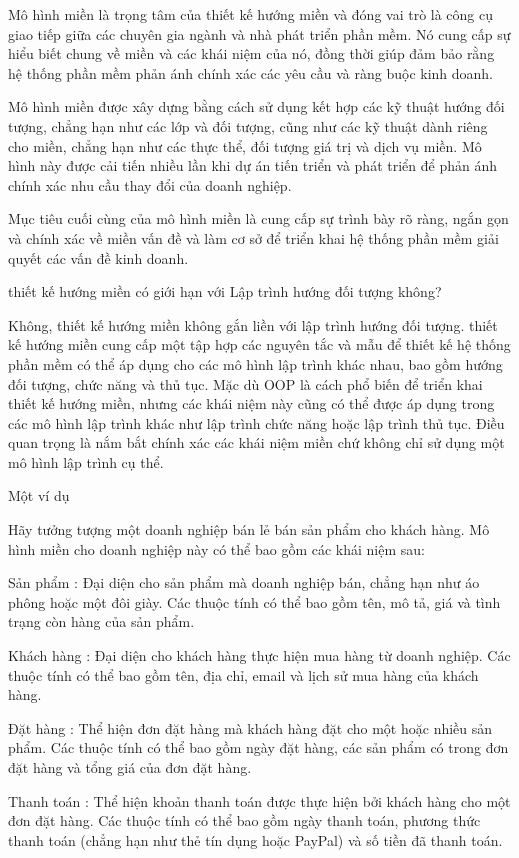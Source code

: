 Mô hình miền là trọng tâm của thiết kế hướng miền và đóng vai trò là công cụ giao tiếp giữa các chuyên gia ngành và nhà phát triển phần mềm. Nó cung cấp sự hiểu biết chung về miền và các khái niệm của nó, đồng thời giúp đảm bảo rằng hệ thống phần mềm phản ánh chính xác các yêu cầu và ràng buộc kinh doanh.

Mô hình miền được xây dựng bằng cách sử dụng kết hợp các kỹ thuật hướng đối tượng, chẳng hạn như các lớp và đối tượng, cũng như các kỹ thuật dành riêng cho miền, chẳng hạn như các thực thể, đối tượng giá trị và dịch vụ miền. Mô hình này được cải tiến nhiều lần khi dự án tiến triển và phát triển để phản ánh chính xác nhu cầu thay đổi của doanh nghiệp.

Mục tiêu cuối cùng của mô hình miền là cung cấp sự trình bày rõ ràng, ngắn gọn và chính xác về miền vấn đề và làm cơ sở để triển khai hệ thống phần mềm giải quyết các vấn đề kinh doanh.

thiết kế hướng miền có giới hạn với Lập trình hướng đối tượng không?

Không, thiết kế hướng miền không gắn liền với lập trình hướng đối tượng. thiết kế hướng miền cung cấp một tập hợp các nguyên tắc và mẫu để thiết kế hệ thống phần mềm có thể áp dụng cho các mô hình lập trình khác nhau, bao gồm hướng đối tượng, chức năng và thủ tục. Mặc dù OOP là cách phổ biến để triển khai thiết kế hướng miền, nhưng các khái niệm này cũng có thể được áp dụng trong các mô hình lập trình khác như lập trình chức năng hoặc lập trình thủ tục. Điều quan trọng là nắm bắt chính xác các khái niệm miền chứ không chỉ sử dụng một mô hình lập trình cụ thể.

Một ví dụ

Hãy tưởng tượng một doanh nghiệp bán lẻ bán sản phẩm cho khách hàng. Mô hình miền cho doanh nghiệp này có thể bao gồm các khái niệm sau:

Sản phẩm : Đại diện cho sản phẩm mà doanh nghiệp bán, chẳng hạn như áo phông hoặc một đôi giày. Các thuộc tính có thể bao gồm tên, mô tả, giá và tình trạng còn hàng của sản phẩm.

Khách hàng : Đại diện cho khách hàng thực hiện mua hàng từ doanh nghiệp. Các thuộc tính có thể bao gồm tên, địa chỉ, email và lịch sử mua hàng của khách hàng.

Đặt hàng : Thể hiện đơn đặt hàng mà khách hàng đặt cho một hoặc nhiều sản phẩm. Các thuộc tính có thể bao gồm ngày đặt hàng, các sản phẩm có trong đơn đặt hàng và tổng giá của đơn đặt hàng.

Thanh toán : Thể hiện khoản thanh toán được thực hiện bởi khách hàng cho một đơn đặt hàng. Các thuộc tính có thể bao gồm ngày thanh toán, phương thức thanh toán (chẳng hạn như thẻ tín dụng hoặc PayPal) và số tiền đã thanh toán.

